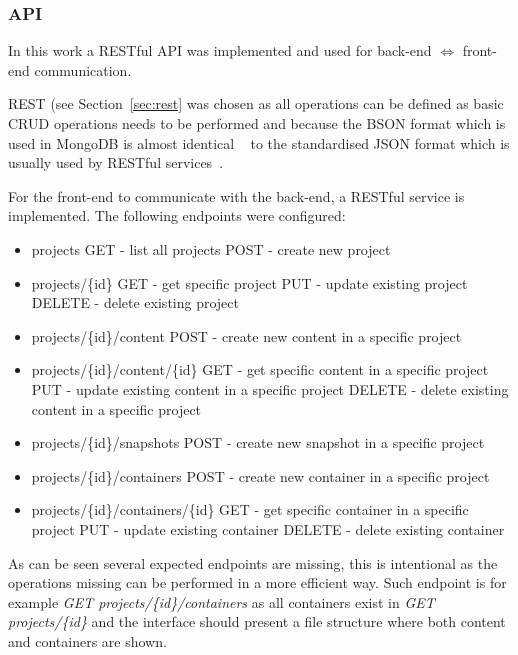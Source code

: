 \documentclass[a4paper,12pt]{article}
\newcounter{subsubsubsection}[subsubsection]
\newcommand{\Iff}{\Leftrightarrow}
\begin{document}
\subsubsection{API} \label{sec:API}
In this work a RESTful API was implemented and used for back-end $\Iff$ front-end
communication.

REST (see Section~\ref{sec:rest} was chosen as all operations can be defined as basic CRUD
operations needs to be performed and because the BSON format which is used in MongoDB is almost
identical ~\cite{BSON} to the standardised JSON format which is usually used by RESTful
services~\cite{JSON}. 

For the front-end to communicate with the back-end, a RESTful service is implemented.
The following endpoints were configured:

\begin{itemize}
  \item projects
      \subitem GET - list all projects
      \subitem POST - create new project
  \item projects/\{id\}
      \subitem GET - get specific project
      \subitem PUT - update existing project
      \subitem DELETE - delete existing project
  \item projects/\{id\}/content
      \subitem POST - create new content in a specific project 
  \item projects/\{id\}/content/\{id\}
      \subitem GET - get specific content in a specific project
      \subitem PUT - update existing content in a specific project
      \subitem DELETE - delete existing content in a specific project

  \item projects/\{id\}/snapshots
      \subitem POST - create new snapshot in a specific project 

  \item projects/\{id\}/containers
      \subitem POST - create new container in a specific project 
  \item projects/\{id\}/containers/\{id\}
      \subitem GET - get specific container in a specific project
      \subitem PUT - update existing container
      \subitem DELETE - delete existing container
\end{itemize}

As can be seen several expected endpoints are missing, this is intentional as the operations missing
can be performed in a more efficient way. Such endpoint is for example \textit{GET 
projects/\{id\}/containers} as all containers exist in \textit{GET projects/\{id\}} and the interface
should present a file structure where both content and containers are shown.
\end{document}
